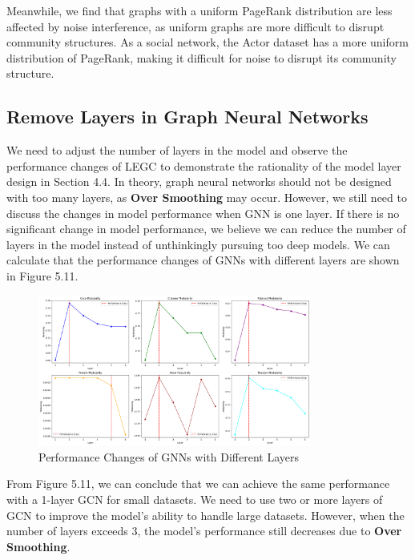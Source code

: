 \documentclass[ %
                    author={Tengyao Tu},
                supervisor={Dr. James Pope},
                    degree={MSc},
                     title={A New Perspective on Graph Community Detection: Combining Traditional Methods with Deep Learning Approaches},
                  subtitle={Applying to Telecom Networks and Diverse Datasets},
                      type={},
                      year={2024}]{dissertation}
\begin{document}
Meanwhile, we find that graphs with a uniform PageRank distribution are less affected by noise interference, as uniform graphs are more difficult to disrupt community structures. As a social network, the Actor dataset has a more uniform distribution of PageRank, making it difficult for noise to disrupt its community structure.
\subsection{Remove Layers in Graph Neural Networks}

We need to adjust the number of layers in the model and observe the performance changes of LEGC to demonstrate the rationality of the model layer design in Section 4.4. In theory, graph neural networks should not be designed with too many layers, as \textbf{Over Smoothing} may occur. However, we still need to discuss the changes in model performance when GNN is one layer. If there is no significant change in model performance, we believe we can reduce the number of layers in the model instead of unthinkingly pursuing too deep models. We can calculate that the performance changes of GNNs with different layers are shown in Figure 5.11.
\begin{figure}[h] %
    \centering
    \includegraphics[width=0.8\textwidth]{Figure_18.png} %
    \caption{ Performance Changes of GNNs with Different Layers}
\end{figure}
From Figure 5.11, we can conclude that we can achieve the same performance with a 1-layer GCN for small datasets. We need to use two or more layers of GCN to improve the model's ability to handle large datasets. However, when the number of layers exceeds 3, the model's performance still decreases due to \textbf{Over Smoothing}.



\end{document}
